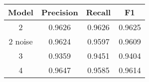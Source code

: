 \documentclass{standalone}
\begin{document}


\begin{tabular}{|c|c|c|c|}
	\hline
	Model	& Precision	& Recall	& F1	\\ \hline
	2		& 0.9626	& 0.9626	& 0.9625 \\ \hline
	2 noise	& 0.9624	& 0.9597	& 0.9609 \\ \hline
	3		& 0.9359	& 0.9451	& 0.9404 \\ \hline
	4		& 0.9647	& 0.9585	& 0.9614 \\ \hline
\end{tabular}
\end{document}
